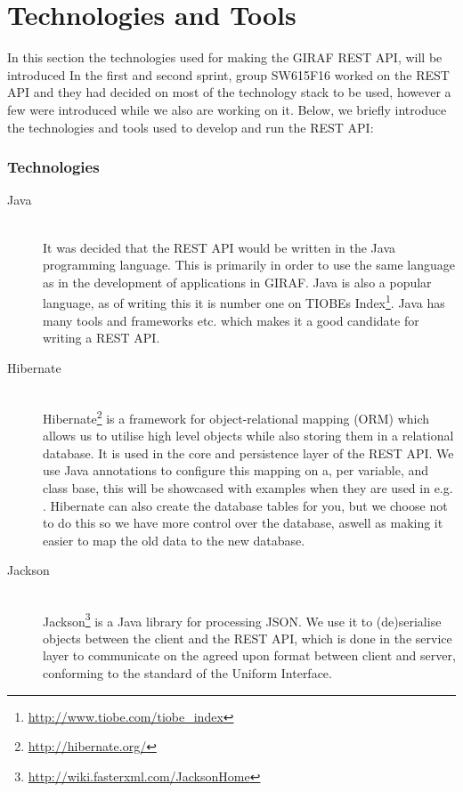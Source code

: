 \section{Technologies and Tools}\label{sec:techstack}
In this section the technologies used for making the GIRAF REST API, will be introduced
In the first and second sprint, group SW615F16 worked on the REST API and they had decided on most of the technology stack to be used, however a few were introduced while we also are working on it.
Below, we briefly introduce the technologies and tools used to develop and run the REST API:
\subsubsection{Technologies}
\begin{description}
    \item[Java] \hfill \\
        It was decided that the REST API would be written in the Java programming language.
        This is primarily in order to use the same language as in the development of applications in GIRAF.
        Java is also a popular language, as of writing this it is number one on TIOBEs Index\footnote{\url{http://www.tiobe.com/tiobe_index}}.
        Java has many tools and frameworks etc. which makes it a good candidate for writing a REST API.

    \item[Hibernate] \hfill \\
        Hibernate\footnote{\url{http://hibernate.org/}} is a framework for object-relational mapping (ORM) which allows us to utilise high level objects while also storing them in a relational database.
        It is used in the core and persistence layer of the REST API.
        We use Java annotations to configure this mapping on a, per variable, and class base, this will be showcased with examples when they are used in e.g. .
        Hibernate can also create the database tables for you, but we choose not to do this so we have more control over the database, aswell as making it easier to map the old data to the new database.

    \item[Jackson] \hfill \\
        Jackson\footnote{\url{http://wiki.fasterxml.com/JacksonHome}} is a Java library for processing JSON.
        We use it to (de)serialise objects between the client and the REST API, which is done in the service layer to communicate on the agreed upon format between client and server, conforming to the standard of the Uniform Interface.


\end{description}
